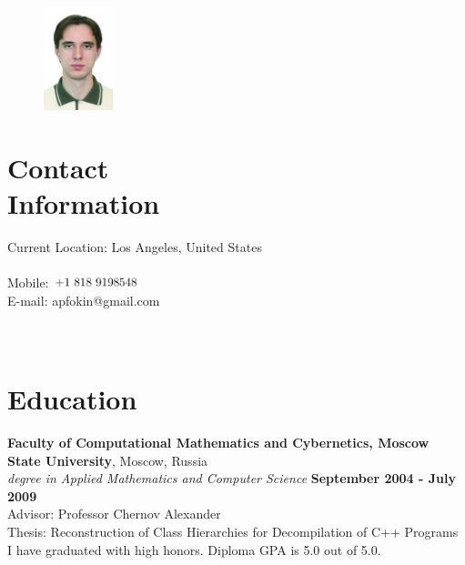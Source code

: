 \documentclass[margin,line]{CV}
\begin{document}
\begin{resume}

\begin{figure}
    \vspace{-20pt}
    \includegraphics[width=2cm]{photo.jpg}
    \vspace{-20pt}
\end{figure}

    \section{\mysidestyle Contact\\Information}
    Current Location: Los Angeles, United States \\
    \\
    Mobile: \includegraphics[height=0.35cm]{phone-us.png} \\ 
    E-mail: apfokin@gmail.com \\
    \\
    \\

    \section{\mysidestyle Education}
    \textbf{Faculty of Computational Mathematics and Cybernetics, Moscow State University}, Moscow, Russia \vspace{2mm}\\\vspace{1mm}%
    \textsl{ degree in Applied Mathematics and Computer Science} \hfill \textbf{September 2004 - July 2009}\vspace{1mm}\\
    Advisor: Professor Chernov Alexander \\
    Thesis: Reconstruction of Class Hierarchies for Decompilation of C++ Programs \\
    I have graduated with high honors. Diploma GPA is 5.0 out of 5.0.


\end{resume}
\end{document}

